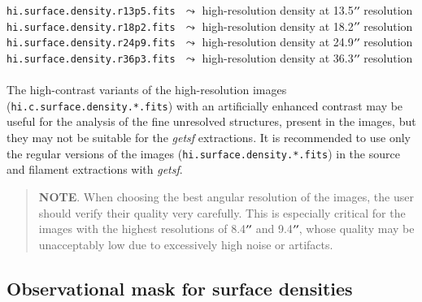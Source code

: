 \documentclass[a4paper,10pt]{article}
\newcommand*{\arcsec}{^{\prime\prime}\mkern-1.2mu}
\begin{document}
{\small\verb!hi.surface.density.r13p5.fits!} $\,\,\leadsto$ high-resolution density at 13.5$\arcsec$ resolution\\
{\small\verb!hi.surface.density.r18p2.fits!} $\,\,\leadsto$ high-resolution density at 18.2$\arcsec$ resolution\\
{\small\verb!hi.surface.density.r24p9.fits!} $\,\,\leadsto$ high-resolution density at 24.9$\arcsec$ resolution\\
{\small\verb!hi.surface.density.r36p3.fits!\vspace{-2mm}} $\,\,\leadsto$ high-resolution density at 36.3$\arcsec$ resolution\\\\
The high-contrast variants of the high-resolution images (\verb!hi.c.surface.density.*.fits!) with an artificially enhanced
contrast may be useful for the analysis of the fine unresolved structures, present in the images, but they may not be suitable for
the \textsl{getsf} extractions. It is recommended to use only the regular versions of the images (\verb!hi.surface.density.*.fits!)
in the source and filament extractions with \textsl{getsf}. 

\begin{quote} %
\textbf{NOTE}. When choosing the best angular resolution of the images, the user should verify their quality very carefully. This
is especially critical for the images with the highest resolutions of 8.4$\arcsec$ and 9.4$\arcsec$, whose quality may be
unacceptably low due to excessively high noise or artifacts.
\end{quote} %


\subsection{Observational mask for surface densities}
\label{densobsmask}
\end{document}
